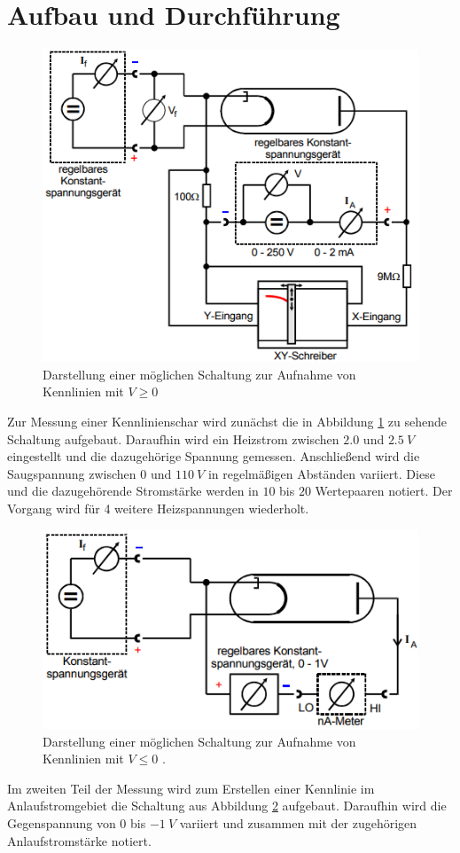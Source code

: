 \section{Aufbau und Durchführung}
\begin{figure}[H]
  \centering
  \includegraphics[width=\linewidth-100pt,height=\textheight-100pt,keepaspectratio]{Text/Bilder/Schaltung1.png}
  \caption{Darstellung einer möglichen Schaltung zur Aufnahme von Kennlinien mit $V\ge0$ \cite[101]{sample}}
  \label{fig:Schaltung1}
\end{figure}
Zur Messung einer Kennlinienschar wird  zunächst die in Abbildung \ref{fig:Schaltung1} zu sehende Schaltung aufgebaut. Daraufhin wird ein Heizstrom zwischen $2.0$ und $\SI{2.5}{V}$ eingestellt und die dazugehörige Spannung gemessen.
Anschließend wird die Saugspannung zwischen $0$ und $\SI{110}{V}$ in regelmäßigen Abständen variiert. Diese und die dazugehörende Stromstärke werden in $10$ bis $20$ Wertepaaren notiert.
Der Vorgang wird für 4 weitere Heizspannungen wiederholt.
\begin{figure}[H]
	\centering
	\includegraphics[width=\linewidth-100pt,height=\textheight-100pt,keepaspectratio]{Text/Bilder/Schaltung2.png}
	\caption{Darstellung einer möglichen Schaltung zur Aufnahme von Kennlinien mit $V\le0$ \cite[102]{sample}.}
	\label{fig:Schaltung2}
\end{figure}
Im zweiten Teil der Messung  wird zum Erstellen einer Kennlinie im Anlaufstromgebiet die
Schaltung aus Abbildung \ref{fig:Schaltung2} aufgebaut.
Daraufhin wird die Gegenspannung von $0$ bis $-\SI{1}{V}$ variiert und zusammen mit der zugehörigen Anlaufstromstärke notiert.
